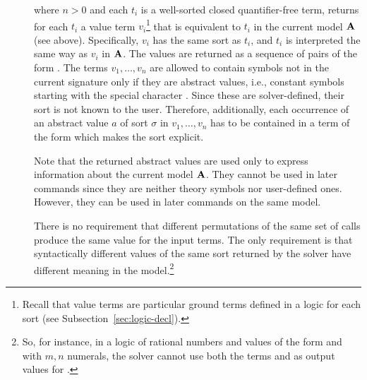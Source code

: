 \begin{description}

%
\item[]
where $n > 0$ and each $t_i$ is a well-sorted closed quantifier-free
term, returns for each $t_i$ a value term $v_i$\footnote{%
Recall that value terms are particular ground terms defined in a logic 
for each sort (see Subsection~\ref{sec:logic-decl}).  
} 
that is equivalent to $t_i$ in the current model $\mathbf{A}$ (see above).
Specifically, $v_i$ has the same sort as $t_i$, and 
$t_i$ is interpreted the same way as $v_i$ in $\mathbf{A}$.
The values are returned as a sequence of pairs of the form 
.
The terms $v_1,\ldots,v_n$  are allowed to contain symbols
not in the current signature only if they are abstract values, 
i.e., constant symbols starting with the special character .
Since these are solver-defined, their sort is not known to the user.
Therefore, additionally, each occurrence of an abstract value 
$a$ of sort $\sigma$ in $v_1,\ldots,v_n$ has to be contained in a term 
of the form  which makes the sort explicit.

Note that the returned abstract values are used only to express 
information about the current model $\mathbf{A}$.
They cannot be used in later  commands 
since they are neither theory symbols nor user-defined ones.
However, they can be used in later  commands 
on the same model.

There is no requirement that different permutations 
of the same set of  calls produce the same value 
for the input terms.
The only requirement is that syntactically different values 
of the same sort returned by the solver have different meaning 
in the model.\footnote{%
So, for instance, in a logic of rational numbers and values of the form
 and  with $m,n$ numerals, 
the solver cannot use both the terms  and 
as output values for .
}


\end{description}
